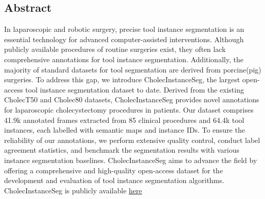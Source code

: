 \subsection*{Abstract}
In laparoscopic and robotic surgery, precise tool instance segmentation is an essential technology for advanced
computer-assisted interventions.
Although publicly available procedures of routine surgeries exist, they often lack comprehensive annotations for tool instance segmentation.
Additionally, the majority of standard datasets for tool segmentation are derived from porcine(pig) surgeries.
To address this gap, we introduce CholecInstanceSeg, the largest open-access tool instance segmentation dataset to date. 
Derived from the existing CholecT50 and Cholec80 datasets, CholecInstanceSeg provides novel annotations for laparoscopic cholecystectomy procedures in patients.
Our dataset comprises 41.9k annotated frames extracted from 85 clinical procedures and 64.4k tool instances, each labelled with semantic maps and instance IDs.
To ensure the reliability of our annotations, we perform extensive quality control, conduct label agreement statistics, and benchmark the segmentation results with various instance segmentation baselines. 
CholecInstanceSeg aims to advance the field by offering a comprehensive and high-quality open-access dataset for the development and evaluation of tool instance segmentation algorithms. 
CholecInstanceSeg is publicly available \href{https://www.synapse.org/Synapse:syn60239971/datasets/}{here}
